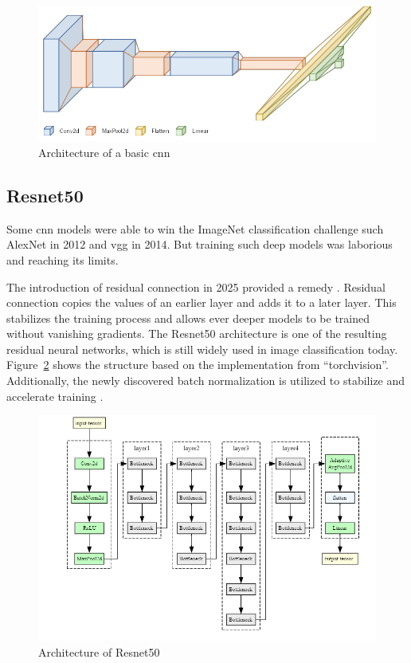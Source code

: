 \begin{figure}[H]
    \begin{center}
    \includegraphics[width=15cm]{../images/cnn_architecture.png}
    \caption{Architecture of a basic \gls{cnn}}\label{fig:cnn_architecture}
    \end{center}
\end{figure}

\subsection{Resnet50}
Some \gls{cnn} models were able to win the ImageNet classification challenge such AlexNet \autocite{krizhevsky2012} in 2012 and \gls{vgg} \autocite{simonyan2015} in 2014. But training such deep models was laborious and reaching its limits. 

The introduction of residual connection in 2025 provided a remedy \autocite{he2015}. Residual connection copies the values of an earlier layer and adds it to a later layer. This stabilizes the training process and allows ever deeper models to be trained without vanishing gradients.
The Resnet50 architecture is one of the resulting residual neural networks, which is still widely used in image classification today. Figure~\ref{fig:resnet50_architecture} shows the structure based on the implementation from ``torchvision''. Additionally, the newly discovered batch normalization is utilized to stabilize and accelerate training \autocite{ioffe2015}.

\begin{figure}[H]
    \begin{center}
    \includegraphics[width=15cm]{../images/resnet50_architecture.png}
    \caption{Architecture of Resnet50}\label{fig:resnet50_architecture}
    \end{center}
\end{figure}

